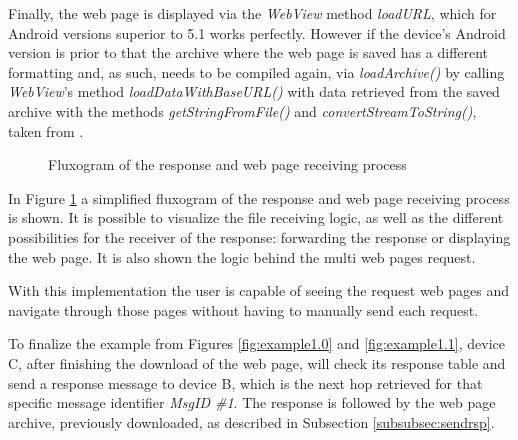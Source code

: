 Finally, the web page is displayed via the \textit{WebView} method \textit{loadURL}, which for Android versions superior to 5.1 works perfectly. However if the device's Android version is prior to that the archive where the web page is saved has a different formatting and, as such, needs to be compiled again, via \textit{loadArchive()} by calling \textit{WebView}'s method \textit{loadDataWithBaseURL()} with data retrieved from the saved archive with the methods \textit{getStringFromFile()} and \textit{convertStreamToString()}, taken from \cite{stack}.

\begin{figure}[ht]
   \noindent{}
	\caption{\label{fig:rsprcvflux} Fluxogram of the response and web page receiving process}
\end{figure}

In Figure \ref{fig:rsprcvflux} a simplified fluxogram of the response and web page receiving process is shown. It is possible to visualize the file receiving logic, as well as the different possibilities for the receiver of the response: forwarding the response or displaying the web page. It is also shown the logic behind the multi web pages request.

With this implementation the user is capable of seeing the request web pages and navigate through those pages without having to manually send each request.

To finalize the example from Figures \ref{fig:example1.0} and \ref{fig:example1.1}, device C, after finishing the download of the web page, will check its response table and send a response message to device B, which is the next hop retrieved for that specific message identifier \textit{MsgID \#1}. The response is followed by the web page archive, previously downloaded, as described in Subsection \ref{subsubsec:sendrsp}.

